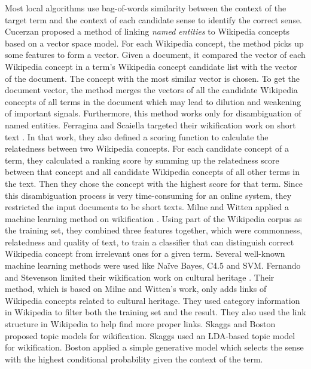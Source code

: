 Most local algorithms use bag-of-words similarity between
the context of the target term and the context of each candidate sense
to identify the correct sense.
Cucerzan \cite{cucerzan2007large} proposed a method of linking
{\em named entities} to Wikipedia concepts based on a vector space model.
For each Wikipedia concept, the method picks up some features to form
a vector. Given a document, it compared the vector of each
Wikipedia concept in a term's Wikipedia concept candidate list
with the vector of the document. The concept with the most similar vector
is chosen. To get the document vector, the method
merges the vectors of all the candidate Wikipedia concepts of all terms
in the document which may lead to dilution and weakening of important signals.
Furthermore, this method works only for disambiguation of named entities.
Ferragina and Scaiella targeted their wikification work on
short text \cite{ferragina2010tagme}.
In that work, they also defined a scoring function to
calculate the relatedness between two Wikipedia concepts.
For each candidate concept of a term, they calculated a ranking score
by summing up the relatedness score between that concept and
all candidate Wikipedia concepts of all
other terms in the text. Then they chose the concept with the
highest score for that term.
Since this disambiguation process is very time-consuming for an online system,
they restricted the input documents to be short texts.
Milne and Witten applied a machine learning method on wikification
\cite{milne2008learning}.
Using part of the Wikipedia corpus as the training set, they combined three
features together, which were commonness, relatedness and quality of text,
to train a classifier that
can distinguish correct Wikipedia concept from irrelevant ones for a given term.
Several well-known machine learning methods were used like
Na\"{i}ve Bayes, C4.5 and SVM.
Fernando and Stevenson limited their wikification work on cultural heritage
\cite{fernando2012adapting}.
Their method, which is based on Milne and Witten's work,
only adds links of Wikipedia concepts related to cultural heritage.
They used category information in Wikipedia to filter
both the training set and the result.
They also used the link structure in Wikipedia to help find more proper
links.
Skaggs \cite{skaggs2011topic} and Boston \cite{Boston:2012} proposed topic
models for wikification. Skaggs used an LDA-based topic model for
wikification. Boston applied a simple generative model which selects the sense
with the highest conditional probability given the context of the term.


